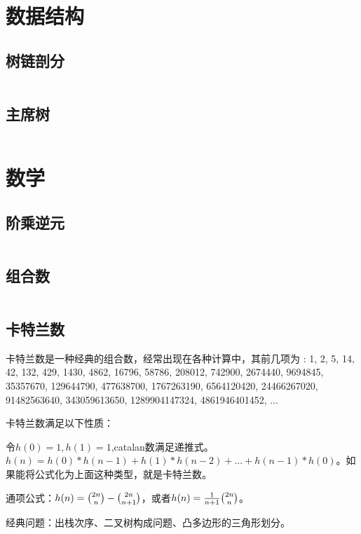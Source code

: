 \documentclass[a4paper,fleqn,11pt]{article}
\begin{document}
\newpage
\section{数据结构}
\subsection{树链剖分}
\inputminted[breaklines]{c++}{DataStructure/树链剖分.cpp}

\subsection{主席树}
\inputminted[breaklines]{c++}{DataStructure/主席树.cpp}

\newpage
\section{数学}

\subsection{阶乘逆元}
\inputminted[breaklines]{c++}{math/Fiv.cpp}

\subsection{组合数}
\inputminted[breaklines]{c++}{math/Combination.cpp}

\subsection{卡特兰数}

卡特兰数是一种经典的组合数，经常出现在各种计算中，其前几项为 : 1, 2, 5, 14, 42, 132, 429, 1430, 4862, 16796, 58786, 208012, 742900, 2674440, 9694845, 35357670, 129644790, 477638700, 1767263190, 6564120420, 24466267020, 91482563640, 343059613650, 1289904147324, 4861946401452, ...

卡特兰数满足以下性质：

令$h(0)=1,h(1)=1$,catalan数满足递推式。$h(n)=h(0)*h(n-1)+h(1)*h(n-2)+...+h(n-1)*h(0)$。如果能将公式化为上面这种类型，就是卡特兰数。

通项公式：$h(n) = \tbinom{2n}{n} -\tbinom{2n}{n+1}$，或者$h(n) = \frac{1}{n+1}\tbinom{2n}{n}$。

经典问题：出栈次序、二叉树构成问题、凸多边形的三角形划分。



\newpage
\end{document}
